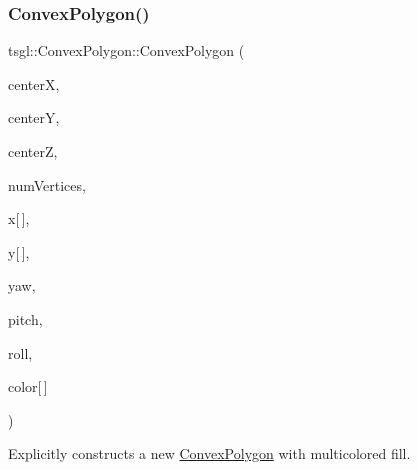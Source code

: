 \subsubsection{\texorpdfstring{Convex\+Polygon()}{ConvexPolygon()}\hspace{0.1cm}{\footnotesize\ttfamily [3/3]}}
{\footnotesize\ttfamily tsgl\+::\+Convex\+Polygon\+::\+Convex\+Polygon (\begin{DoxyParamCaption}\item[{float}]{centerX,  }\item[{float}]{centerY,  }\item[{float}]{centerZ,  }\item[{int}]{num\+Vertices,  }\item[{G\+Lfloat}]{x\mbox{[}$\,$\mbox{]},  }\item[{G\+Lfloat}]{y\mbox{[}$\,$\mbox{]},  }\item[{float}]{yaw,  }\item[{float}]{pitch,  }\item[{float}]{roll,  }\item[{\hyperlink{structtsgl_1_1_color_float}{Color\+Float}}]{color\mbox{[}$\,$\mbox{]} }\end{DoxyParamCaption})}



Explicitly constructs a new \hyperlink{classtsgl_1_1_convex_polygon}{Convex\+Polygon} with multicolored fill. 

